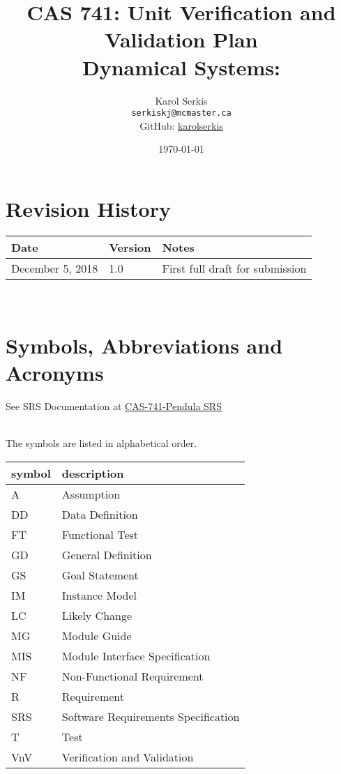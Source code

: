 \documentclass[12pt, titlepage]{article}
\begin{document}
\title{CAS 741: Unit Verification and Validation Plan\\[10pt]\Large Dynamical Systems: \progname}
\author{Karol Serkis\\\texttt{serkiskj@mcmaster.ca}\\GitHub:
\href{https://www.github.com/karolserkis}{karolserkis}}
\date{\today}
	
\maketitle


\section{Revision History}

\begin{tabularx}{\textwidth}{p{4cm}p{2cm}X}
\toprule {\bf Date} & {\bf Version} & {\bf Notes}\\
\midrule
December 5, 2018 & 1.0 &  First full draft for submission\\
\bottomrule
\end{tabularx}

~\newpage

\section{Symbols, Abbreviations and Acronyms}

See SRS Documentation at 
\href{https://github.com/karolserkis/CAS-741-Pendula/blob/master/docs/SRS/SRS.pdf}{CAS-741-Pendula SRS}

\\
The symbols are listed in alphabetical order.\\

\renewcommand{\arraystretch}{1.2}
\begin{tabular}{l l} 
  \toprule		
  \textbf{symbol} & \textbf{description}\\
  \midrule 
  A & Assumption\\
  DD & Data Definition\\
  FT & Functional Test \\
  GD & General Definition\\
  GS & Goal Statement\\
  IM & Instance Model\\
  LC & Likely Change\\
  MG & Module Guide\\ 
  MIS & Module Interface Specification\\ 
  NF & Non-Functional Requirement\\
  R & Requirement\\
  SRS & Software Requirements Specification\\
  T & Test\\
  VnV & Verification and Validation\\ 
  \bottomrule
\end{tabular}\\
\end{document}

